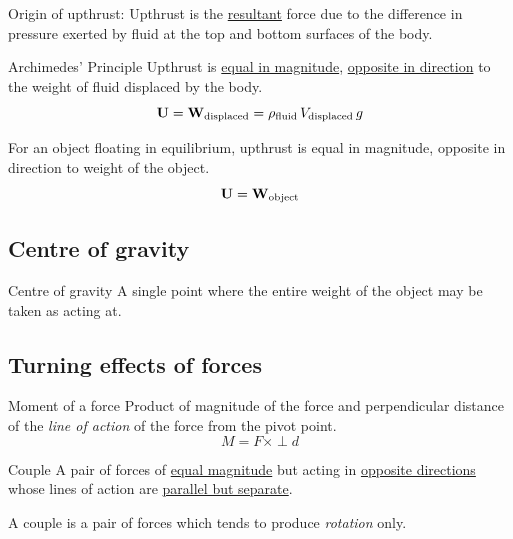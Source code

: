 \begin{remark}
Origin of upthrust: Upthrust is the \underline{resultant} force due to the difference in pressure exerted by fluid at the top and bottom surfaces of the body.
\end{remark}

\begin{defn}{Archimedes' Principle}{}
Upthrust is \underline{equal in magnitude}, \underline{opposite in direction} to the weight of fluid displaced by the body.
\begin{equation}
\vb{U}=\vb{W}_{\text{displaced}}=\rho_{\text{fluid}}\, V_{\text{displaced}}\,g
\end{equation}
\end{defn}


For an object floating in equilibrium, upthrust is equal in magnitude, opposite in direction to weight of the object.
\begin{equation}
\vb{U}=\vb{W}_{\text{object}}
\end{equation}

\subsection{Centre of gravity}
\begin{defn}{Centre of gravity}{}
A single point where the entire weight of the object may be taken as acting at.
\end{defn} 

\subsection{Turning effects of forces}
\begin{defn}{Moment of a force}{}
Product of magnitude of the force and perpendicular distance of the \emph{line of action} of the force from the pivot point.
\begin{equation} M = F \times \perp d \end{equation}
\end{defn}

\begin{defn}{Couple}{}
A pair of forces of \underline{equal magnitude} but acting in \underline{opposite directions} whose lines of action are \underline{parallel but separate}.
\end{defn} 

\begin{remark}
A couple is a pair of forces which tends to produce \emph{rotation} only.
\end{remark}

